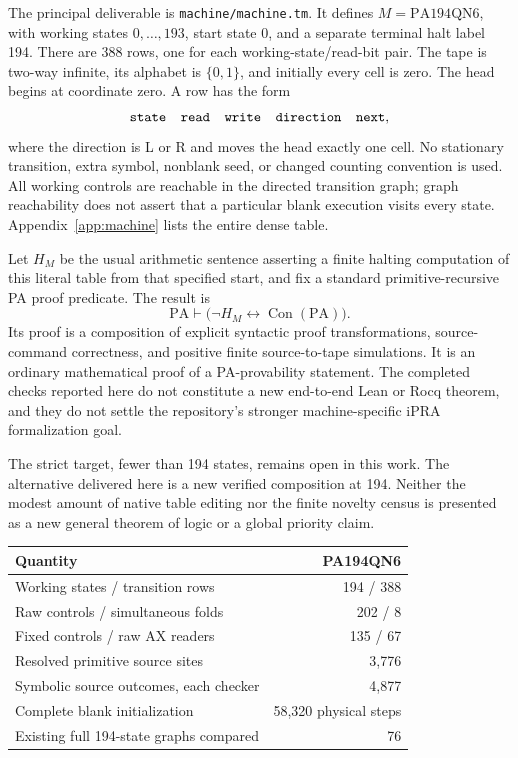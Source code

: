 \documentclass[11pt,letterpaper]{article}
\newcommand{\PA}{\mathrm{PA}}
\newcommand{\Con}{\operatorname{Con}}
\newcommand{\file}[1]{\texttt{\nolinkurl{#1}}}
\begin{document}
The principal deliverable is \file{machine/machine.tm}. It defines
$M=\mathrm{PA194QN6}$, with working states $0,\ldots,193$, start state 0,
and a separate terminal halt label 194. There are 388 rows, one for each
working-state/read-bit pair. The tape is two-way infinite, its alphabet is
$\{0,1\}$, and initially every cell is zero. The head begins at coordinate
zero. A row has the form
\[
    \texttt{state\quad read\quad write\quad direction\quad next},
\]
where the direction is L or R and moves the head exactly one cell. No
stationary transition, extra symbol, nonblank seed, or changed counting
convention is used. All working controls are reachable in the directed
transition graph; graph reachability does not assert that a particular
blank execution visits every state. Appendix~\ref{app:machine} lists the
entire dense table.

Let $H_M$ be the usual arithmetic sentence asserting a finite halting
computation of this literal table from that specified start, and fix a
standard primitive-recursive PA proof predicate. The result is
\begin{equation}
 \boxed{\quad \PA\vdash\bigl(\neg H_M\leftrightarrow\Con(\PA)\bigr).\quad}
 \label{eq:main}
\end{equation}
Its proof is a composition of explicit syntactic proof transformations,
source-command correctness, and positive finite source-to-tape simulations.
It is an ordinary mathematical proof of a PA-provability statement.
The completed checks reported here do not constitute a new end-to-end
Lean or Rocq theorem, and they do not settle the repository's stronger
machine-specific iPRA formalization goal.

The strict target, fewer than 194 states, remains open in this work. The
alternative delivered here is a new verified composition at 194. Neither
the modest amount of native table editing nor the finite novelty census
is presented as a new general theorem of logic or a global priority claim.

\begin{center}
\begin{tabular}{@{}lr@{}}
\toprule Quantity & PA194QN6\\\midrule
Working states / transition rows &194 / 388\\
Raw controls / simultaneous folds &202 / 8\\
Fixed controls / raw AX readers &135 / 67\\
Resolved primitive source sites &3,776\\
Symbolic source outcomes, each checker &4,877\\
Complete blank initialization &58,320 physical steps\\
Existing full 194-state graphs compared &76\\
\bottomrule
\end{tabular}
\end{center}
\end{document}
